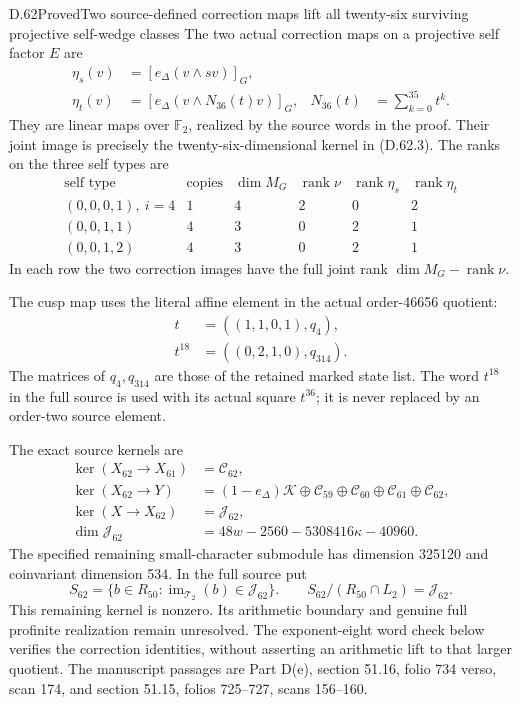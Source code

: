 \begin{statement}{D.62}{Proved}{Two source-defined correction maps lift all twenty-six surviving projective self-wedge classes}
The two actual correction maps on a
projective self factor \(E\) are
\[
 \begin{aligned}
 \eta_s(v)&=[e_\Delta(v\wedge sv)]_G,\\
 \eta_t(v)&=[e_\Delta(v\wedge N_{36}(t)v)]_G,
       &N_{36}(t)&=\sum_{k=0}^{35}t^k.
 \end{aligned}
 \tag{D.62.7}
\]
They are linear maps over \(\mathbb F_2\),
realized by the source words in the proof.
Their joint image is precisely the
twenty-six-dimensional kernel in (D.62.3).
The ranks on the three self types are
\[
 \begin{array}{c|r|r|r|r|r}
 \text{self type}&\text{copies}&\dim M_G
   &\operatorname{rank}\nu&\operatorname{rank}\eta_s
   &\operatorname{rank}\eta_t\\\hline
 (0,0,0,1),\ i=4&1&4&2&0&2\\
 (0,0,1,1)&4&3&0&2&1\\
 (0,0,1,2)&4&3&0&2&1
 \end{array}
 \tag{D.62.8}
\]
In each row the two correction images
have the full joint rank
\(\dim M_G-\operatorname{rank}\nu\).

The cusp map uses the literal affine
element in the actual order-46656
quotient:
\[
 \begin{aligned}
 t&=((1,1,0,1),q_4),\\
 t^{18}&=((0,2,1,0),q_{314}).
 \end{aligned}
 \tag{D.62.9}
\]
The matrices of \(q_4,q_{314}\)
are those of the retained marked state
list. The word \(t^{18}\) in the
full source is used with its actual
square \(t^{36}\); it is never
replaced by an order-two source element.

The exact source kernels are
\[
 \begin{aligned}
 \ker(X_{62}\to X_{61})&=\mathcal C_{62},\\
 \ker(X_{62}\to Y)&=(1-e_\Delta)\mathcal K
    \oplus\mathcal C_{59}\oplus\mathcal C_{60}
    \oplus\mathcal C_{61}\oplus\mathcal C_{62},\\
 \ker(X\to X_{62})&=\mathcal J_{62},\\
 \dim\mathcal J_{62}&=48w-2560-5308416\kappa-40960.
 \end{aligned}
 \tag{D.62.10}
\]
The specified remaining small-character
submodule has dimension 325120 and
coinvariant dimension 534. In the full
source put
\[
 S_{62}=\{b\in R_{50}:
        \operatorname{im}_{\mathcal T_2}(b)\in\mathcal J_{62}\}.
 \qquad
 S_{62}/(R_{50}\cap L_2)=\mathcal J_{62}.
 \tag{D.62.11}
\]
This remaining kernel is nonzero.
Its arithmetic boundary and genuine
full profinite realization remain
unresolved. The exponent-eight word
check below verifies the correction
identities, without asserting an
arithmetic lift to that larger quotient.
The manuscript passages are Part D(e),
section 51.16, folio 734 verso, scan 174,
and section 51.15, folios 725--727,
scans 156--160.
\end{statement}
